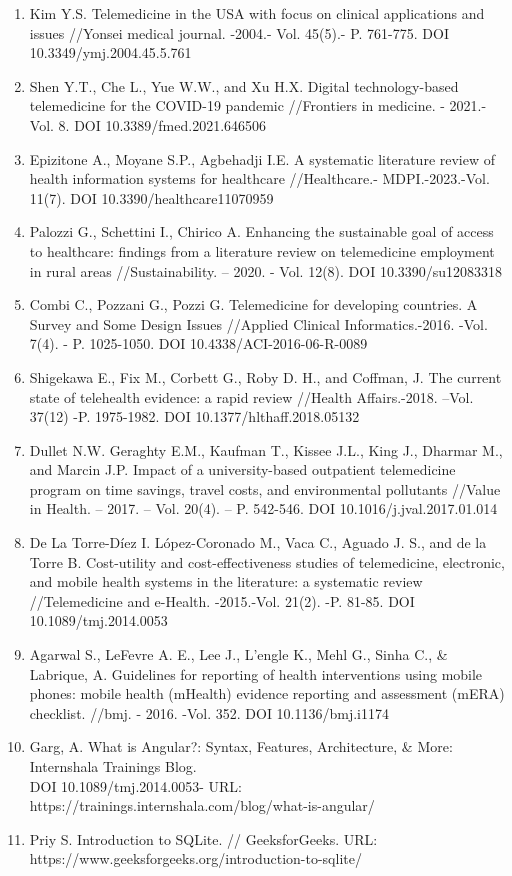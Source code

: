 \begin{noparindent}
\begin{enumerate}
\item
  Kim Y.S. Telemedicine in the USA with focus on clinical applications
  and issues //Yonsei medical journal. -2004.- Vol. 45(5).- P. 761-775.
  DOI 10.3349/ymj.2004.45.5.761
\item
  Shen Y.T., Che L., Yue W.W., and Xu H.X. Digital technology-based
  telemedicine for the COVID-19 pandemic //Frontiers in medicine. -
  2021.-Vol. 8. DOI 10.3389/fmed.2021.646506
\item
  Epizitone A., Moyane S.P., Agbehadji I.E. A systematic literature
  review of health information systems for healthcare //Healthcare.-
  MDPI.-2023.-Vol. 11(7). DOI 10.3390/healthcare11070959

\item
  Palozzi G., Schettini I., Chirico A. Enhancing the sustainable goal of
  access to healthcare: findings from a literature review on
  telemedicine employment in rural areas //Sustainability. -- 2020. -
  Vol. 12(8). DOI 10.3390/su12083318
\item
  Combi C., Pozzani G., Pozzi G. Telemedicine for developing countries.
  A Survey and Some Design Issues //Applied Clinical Informatics.-2016.
  -Vol. 7(4). - P. 1025-1050. DOI 10.4338/ACI-2016-06-R-0089

\item
  Shigekawa E., Fix M., Corbett G., Roby D. H., and Coffman, J. The
  current state of telehealth evidence: a rapid review //Health
  Affairs.-2018. --Vol. 37(12) -P. 1975-1982. DOI 10.1377/hlthaff.2018.05132

\item
  Dullet N.W. Geraghty E.M., Kaufman T., Kissee J.L., King J., Dharmar
  M., and Marcin J.P. Impact of a university-based outpatient
  telemedicine program on time savings, travel costs, and environmental
  pollutants //Value in Health. -- 2017. -- Vol. 20(4). -- P. 542-546.
  DOI 10.1016/j.jval.2017.01.014
\item
  De La Torre-Díez I. López-Coronado M., Vaca C., Aguado J. S., and de
  la Torre B. Cost-utility and cost-effectiveness studies of
  telemedicine, electronic, and mobile health systems in the literature:
  a systematic review //Telemedicine and e-Health. -2015.-Vol. 21(2).
  -P. 81-85. DOI 10.1089/tmj.2014.0053
\item
  Agarwal S., LeFevre A. E., Lee J., L'engle K., Mehl G., Sinha C., \&
  Labrique, A. Guidelines for reporting of health interventions using
  mobile phones: mobile health (mHealth) evidence reporting and
  assessment (mERA) checklist. //bmj. - 2016. -Vol. 352. DOI
  10.1136/bmj.i1174
\item
  Garg, A. What is Angular?: Syntax, Features, Architecture, \& More:
  Internshala Trainings Blog. \\DOI 10.1089/tmj.2014.0053- URL:  https://trainings.internshala.com/blog/what-is-angular/
\item
  Priy S. Introduction to SQLite. // GeeksforGeeks.
  URL: https://www.geeksforgeeks.org/introduction-to-sqlite/
\end{enumerate}

\end{noparindent}

